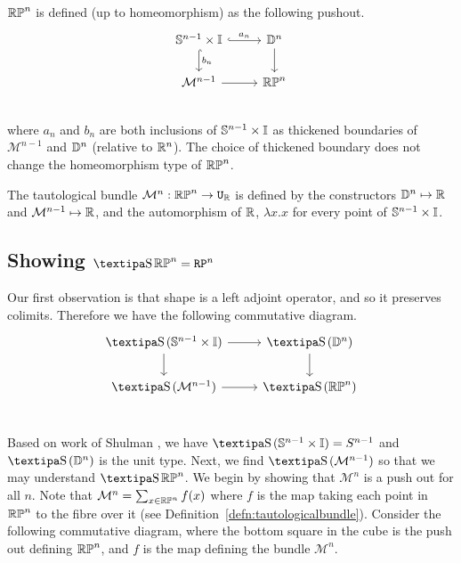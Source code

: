\documentclass{amsart}
\begin{document}
\begin{definition} $\mathbb{RP}^n$ is defined (up to homeomorphism) as the following pushout.\\
\[\begin{tikzcd}
\set{S}^{n-1} \times \set{I} \arrow[r, hook, "a_n"] \arrow[d, hook, "b_n" ] &\set{D}^{n} \arrow[d]\\
\mathcal{M}^{n-1} \arrow[r] &\set{RP}^n\\
\end{tikzcd}
\] where $a_n$ and $b_n$ are both inclusions of $\mathbb{S}^{n-1} \times \mathbb{I} $ as thickened boundaries of $\mathcal{M}^{n-1}$ and $\mathbb{D}^{n}$ (relative to $\mathbb{R}^n$). The choice of thickened boundary does not change the homeomorphism type of $\mathbb{RP}^n$.
\end{definition}

\begin{definition}
\label{defn:tautologicalbundle}
The tautological bundle $\mathcal{M}^n: \mathbb{RP}^n \rightarrow \mathtt{U}_{\mathbb{R}}$ is defined by the constructors $\mathbb{D}^n \mapsto \mathbb{R}$ and $\mathcal{M}^{n-1} \mapsto \mathbb{R}$, and the automorphism of $\mathbb{R}$, $\lambda x.x$ for every point of $\mathbb{S}^{n-1} \times \mathbb{I}$.
\end{definition}



\subsection{Showing $ \shape \set{RP}^n = \RP^n $}
Our first observation is that shape is a left adjoint operator, and so it preserves colimits. Therefore we have the following commutative diagram.
\[\begin{tikzcd}
\shape(\set{S}^{n-1} \times \set{I}) \arrow[r] \arrow[d] &\shape (\set{D}^{n}) \arrow[d]\\
\shape (\mathcal{M}^{n-1}) \arrow[r] &\shape (\set{RP}^n)\\
\end{tikzcd}
\] 

Based on work of Shulman \cite{shul:bfp}, we have $\shape(\set{S}^{n-1} \times \set{I}) =S^{n-1}$ and $\shape (\set{D}^{n})$ is the unit type. Next, we find $\shape (\mathcal{M}^{n-1})$ so that we may understand $ \shape \set{RP}^n$.  We begin by showing that $\mathcal{M}^{n}$ is a push out for all $n$. Note that $\mathcal{M}^n= \sum _{x \in \mathbb{RP}^n} f(x)$ where $f$ is the map taking each point in $\mathbb{RP}^n$ to the fibre over it (see Definition~\ref{defn:tautologicalbundle}). Consider the following commutative diagram, where the bottom square in the cube is the push out defining $\mathbb{RP}^n$, and $f$ is the map defining the bundle  $ \mathcal{M}^{n}$.
\end{document}

